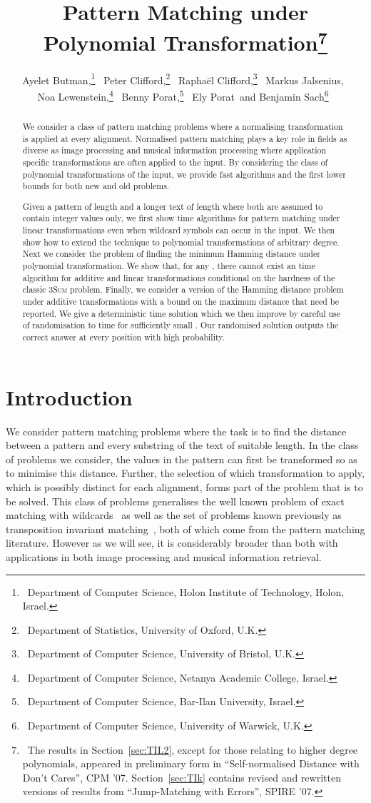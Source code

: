 \documentclass[11pt]{article}
\title{Pattern Matching under Polynomial Transformation\thanks{~The results in Section~\ref{sec:TIL2}, except for those relating to higher degree polynomials, appeared in preliminary form in ``Self-normalised Distance with Don't Cares'', CPM '07.   Section~\ref{sec:TIk} contains revised and rewritten versions of results from ``Jump-Matching with Errors'', SPIRE '07.}}
\author{\ Ayelet Butman,\thanks{~Department of Computer Science, Holon Institute of Technology, Holon, Israel.}
\ Peter Clifford,\thanks{~Department of Statistics, University of Oxford, U.K.}
\ Rapha\"el Clifford,\thanks{~Department of Computer Science, University of Bristol, U.K.}
\ Markus Jalsenius,\footnotemark[4]~~
\\Noa Lewenstein,\thanks{~Department of Computer Science, Netanya Academic College, Israel.}
\ Benny Porat,\thanks{~Department of Computer Science, Bar-Ilan University, Israel.}
\ Ely Porat\footnotemark[6]
\ and Benjamin Sach\thanks{~Department of Computer Science, University of Warwick, U.K.}~
}
\date{}
\newcommand{\threeSUM}{\textsc{3Sum}\xspace}
\theoremstyle{plain}
\theoremstyle{definition}
\begin{document}
\maketitle

\begin{abstract}
    We consider a class of pattern matching problems where a normalising transformation is applied at every alignment. Normalised pattern matching plays a key role in fields as diverse as image processing and musical information processing where application specific transformations are often applied to the input.  By considering the class of polynomial transformations of the input, we provide  fast algorithms and the first lower bounds for both new and old problems.

    Given a pattern of length  and a longer text of length  where both are assumed to contain integer values only, we first show  time algorithms for pattern matching under linear transformations even when wildcard symbols can occur in the input.  We then show how to extend the technique to polynomial transformations of arbitrary degree.  Next we consider the problem of finding the minimum Hamming distance under polynomial transformation. We show that, for any , there cannot exist an  time algorithm for additive and linear transformations conditional on the hardness of the classic \threeSUM problem. Finally, we consider a version of the Hamming distance problem under additive transformations with a bound  on the maximum distance that need be reported.  We give a deterministic  time solution which we then improve by careful use of randomisation to  time for sufficiently small . Our randomised solution outputs the correct answer at every position with high probability.
\end{abstract}







\section{Introduction}

We consider pattern matching problems where the task is to find the distance between a pattern and every substring of the text of suitable length.  In the class of problems we consider, the values in the pattern can first be transformed so as to minimise this distance. Further, the selection of which transformation to apply, which is possibly distinct for each alignment, forms part of the problem that is to be solved. This class of problems generalises the well known problem of exact matching with wildcards~\cite{CH:2002, Clifford:2007} as well as the set of problems known previously as transposition invariant matching~\cite{MNU:2005}, both of which come from the pattern matching literature. However as we will see, it is considerably broader than both with applications in both image processing and musical information retrieval.
\end{document}
